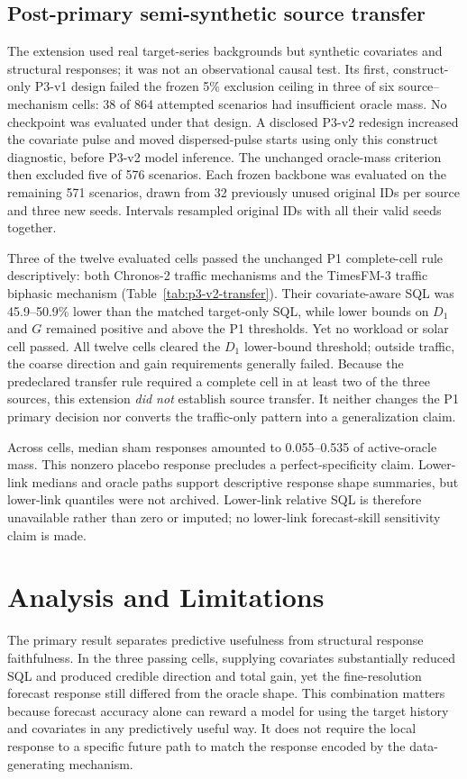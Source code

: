 \documentclass[conference]{IEEEtran}
\begin{document}
\subsection{Post-primary semi-synthetic source transfer}
The extension used real target-series backgrounds but synthetic covariates and
structural responses; it was not an observational causal test. Its first,
construct-only P3-v1 design failed the frozen 5\% exclusion ceiling in three of
six source--mechanism cells: 38 of 864 attempted scenarios had insufficient
oracle mass. No checkpoint was evaluated under that design. A disclosed P3-v2
redesign increased the covariate pulse and moved dispersed-pulse starts using
only this construct diagnostic, before P3-v2 model inference. The unchanged
oracle-mass criterion then excluded five of 576 scenarios. Each frozen
backbone was evaluated on the remaining 571 scenarios, drawn from 32
previously unused original IDs per source and three new seeds. Intervals
resampled original IDs with all their valid seeds together.


Three of the twelve evaluated cells passed the unchanged P1 complete-cell rule
descriptively: both Chronos-2 traffic mechanisms and the TimesFM-3 traffic
biphasic mechanism (Table~\ref{tab:p3-v2-transfer}). Their covariate-aware SQL
was 45.9--50.9\% lower than the matched target-only SQL, while lower bounds on
$D_1$ and $G$ remained positive and above the P1 thresholds. Yet no workload
or solar cell passed. All twelve cells cleared the $D_1$ lower-bound threshold;
outside traffic, the coarse direction and gain requirements generally failed.
Because the predeclared transfer rule required a complete cell in at least two
of the three sources, this extension \emph{did not} establish source transfer.
It neither changes the P1 primary decision nor converts the traffic-only
pattern into a generalization claim.

Across cells, median sham responses amounted to 0.055--0.535 of active-oracle
mass. This nonzero placebo response precludes a perfect-specificity claim.
Lower-link medians and oracle paths support descriptive response
shape summaries, but lower-link quantiles were not archived. Lower-link relative
SQL is therefore unavailable rather than zero or imputed; no lower-link
forecast-skill sensitivity claim is made.

\section{Analysis and Limitations}
The primary result separates predictive usefulness from structural response
faithfulness. In the three passing cells, supplying covariates substantially reduced
SQL and produced credible direction and total gain, yet the fine-resolution forecast
response still differed from the oracle shape. This combination matters because forecast
accuracy alone can reward a model for using the target history and covariates in any
predictively useful way. It does not require the local response to a specific future
path to match the response encoded by the data-generating mechanism.
\end{document}
